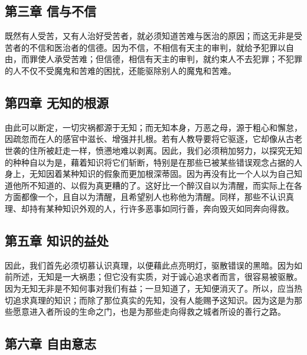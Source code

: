 \subsection{第三章 信与不信}

既然有人受苦，又有人治好受苦者，就必须知道苦难与医治的原因；而这无非是受苦者的不信和医治者的信德。因为不信，不相信有天主的审判，就给予犯罪以自由，而罪使人承受苦难；但信德，相信有天主的审判，就约束人不去犯罪；不犯罪的人不仅不受魔鬼和苦难的困扰，还能驱除别人的魔鬼和苦难。\par


\subsection{第四章 无知的根源}

由此可以断定，一切灾祸都源于无知；而无知本身，万恶之母，源于粗心和懈怠，因疏忽而在人的感官中滋长、增强并扎根。若有人教导要将它驱逐，它却像从古老世袭的住所被赶走一样，愤懑地难以剥离。因此，我们必须稍加努力，以探究无知的种种自以为是，藉着知识将它们斩断，特别是在那些已被某些错误观念占据的人身上，无知因着某种知识的假象而更加根深蒂固。因为再没有比一个人以为自己知道他所不知道的、以假为真更糟的了。这好比一个醉汉自以为清醒，而实际上在各方面都像一个，且自以为清醒，且希望别人也称他为清醒。同样，那些不认识真理、却持有某种知识外观的人，行许多恶事如同行善，奔向毁灭如同奔向得救。\par


\subsection{第五章 知识的益处}

因此，我们首先必须切慕认识真理，以便藉此点亮明灯，驱散错误的黑暗。因为如前所述，无知是一大祸患；但它没有实质，对于诚心追求者而言，很容易被驱散。因为无知无非是不知何事对我们有益；一旦知道了，无知便消灭了。所以，应当热切追求真理的知识；而除了那位真实的先知，没有人能赐予这知识。因为这是为那些愿意进入者所设的生命之门，也是为那些走向得救之城者所设的善行之路。\par


\subsection{第六章 自由意志}

